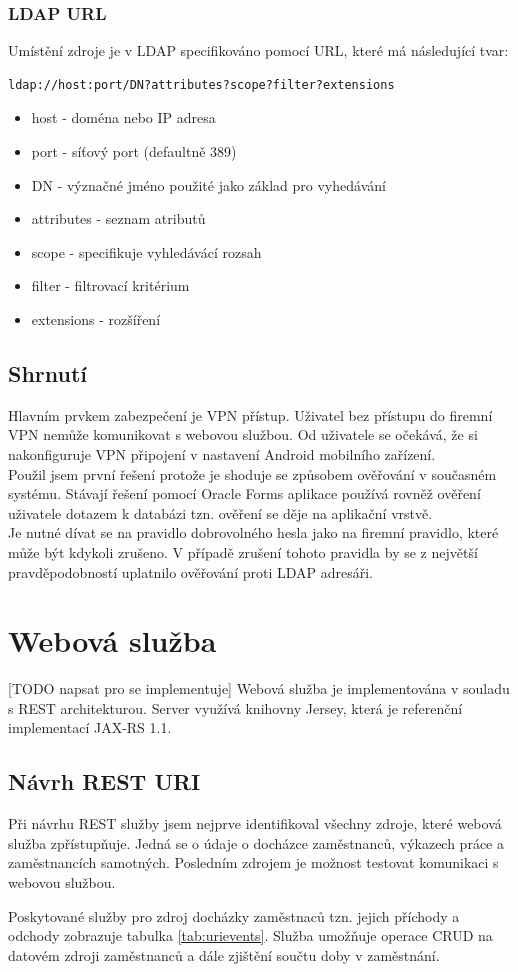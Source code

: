 \documentclass{diplomka}
\begin{document}
\subsection*{LDAP URL}
Umístění zdroje je v LDAP specifikováno pomocí URL, které má následující tvar:
\begin{verbatim}
ldap://host:port/DN?attributes?scope?filter?extensions
\end{verbatim}
\begin{itemize}[noitemsep,nolistsep]
\item host - doména nebo IP adresa
\item port - síťový port (defaultně 389)
\item DN - význačné jméno použité jako základ pro vyhedávání
\item attributes -  seznam atributů
\item scope - specifikuje vyhledávácí rozsah  
\item filter - filtrovací kritérium
\item extensions - rozšíření
\end{itemize}

\section{Shrnutí}
Hlavním prvkem zabezpečení je VPN přístup. Uživatel bez přístupu do firemní VPN nemůže komunikovat s webovou službou. Od uživatele se očekává, že si nakonfiguruje VPN připojení v nastavení Android mobilního zařízení.\\ \indent
Použil jsem první řešení protože je shoduje se způsobem ověřování v současném systému. Stávají řešení pomocí Oracle Forms aplikace používá rovněž ověření uživatele dotazem k databázi tzn. ověření se děje na aplikační vrstvě. \\ \indent
Je nutné dívat se na pravidlo dobrovolného hesla jako na firemní pravidlo, které může být kdykoli zrušeno. V případě zrušení tohoto pravidla by se z největší pravděpodobností uplatnilo ověřování proti LDAP adresáři. 

\chapter{Webová služba}
[TODO napsat pro se implementuje]
Webová služba je implementována v souladu s REST architekturou. Server využívá knihovny Jersey\cite{jersey}, která je referenční implementací JAX-RS 1.1\cite{jaxrs}.


\section{Návrh REST URI}
Při návrhu REST služby jsem nejprve identifikoval všechny zdroje, které webová služba zpřístupňuje. Jedná se o údaje o docházce zaměstnanců, výkazech práce a zaměstnancích samotných. Posledním zdrojem je možnost testovat komunikaci s webovou službou. \par
Poskytované služby pro zdroj docházky zaměstnaců tzn. jejich příchody a odchody zobrazuje tabulka \ref{tab:urievents}. Služba umožňuje operace CRUD na datovém zdroji zaměstnanců a dále zjištění součtu doby v zaměstnání.
\end{document}
